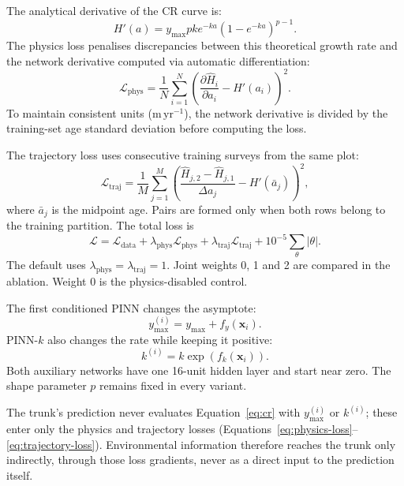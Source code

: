 The analytical derivative of the CR curve is:
\begin{equation}
H'(a)=y_{\max}pk e^{-ka}\left(1-e^{-ka}\right)^{p-1}.
\label{eq:cr-derivative}
\end{equation}
The physics loss penalises discrepancies between this theoretical growth rate and the network derivative computed via automatic differentiation:
\begin{equation}
\mathcal{L}_{\mathrm{phys}}=\frac{1}{N}\sum_{i=1}^{N}
\left(\frac{\partial\hat H_i}{\partial a_i}-H'(a_i)\right)^2.
\label{eq:physics-loss}
\end{equation}
To maintain consistent units ($\mathrm{m\,yr^{-1}}$), the network derivative is divided by the training-set age standard deviation before computing the loss.

The trajectory loss uses consecutive training surveys from the same plot:
\begin{equation}
\mathcal{L}_{\mathrm{traj}}=\frac{1}{M}\sum_{j=1}^{M}
\left(\frac{\hat H_{j,2}-\hat H_{j,1}}{\Delta a_j}-H'(\bar a_j)\right)^2,
\label{eq:trajectory-loss}
\end{equation}
where $\bar a_j$ is the midpoint age. Pairs are formed only when both rows belong to the training
partition. The total loss is
\begin{equation}
\mathcal{L}=\mathcal{L}_{\mathrm{data}}+
\lambda_{\mathrm{phys}}\mathcal{L}_{\mathrm{phys}}+
\lambda_{\mathrm{traj}}\mathcal{L}_{\mathrm{traj}}+
10^{-5}\sum_{\theta}|\theta|.
\label{eq:total-loss}
\end{equation}
The default uses $\lambda_{\mathrm{phys}}=\lambda_{\mathrm{traj}}=1$. Joint weights 0, 1 and 2
are compared in the ablation. Weight 0 is the physics-disabled control.

The first conditioned PINN changes the asymptote:
\begin{equation}
y_{\max}^{(i)}=y_{\max}+f_y(\mathbf{x}_i).
\label{eq:ymax-adjust}
\end{equation}
PINN-$k$ also changes the rate while keeping it positive:
\begin{equation}
k^{(i)}=k\exp\!\left(f_k(\mathbf{x}_i)\right).
\label{eq:k-adjust}
\end{equation}
Both auxiliary networks have one 16-unit hidden layer and start near zero. The shape parameter
$p$ remains fixed in every variant.

The trunk's prediction never evaluates Equation~\ref{eq:cr} with $y_{\max}^{(i)}$ or $k^{(i)}$;
these enter only the physics and trajectory losses (Equations~\ref{eq:physics-loss}--
\ref{eq:trajectory-loss}). Environmental information therefore reaches the trunk only indirectly,
through those loss gradients, never as a direct input to the prediction itself. 

